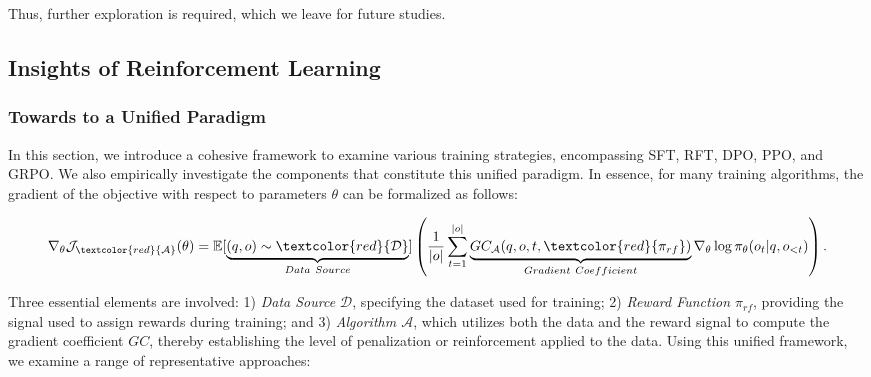 \begin{itemize}[topsep=0pt]
\begin{itemize}[topsep=0pt]
Thus, further exploration is required, which we leave for future studies.

\subsection{Insights of Reinforcement Learning}
\subsubsection{Towards to a Unified Paradigm} In this section, we introduce a cohesive framework to examine various training strategies, encompassing SFT, RFT, DPO, PPO, and GRPO. We also empirically investigate the components that constitute this unified paradigm. In essence, for many training algorithms, the gradient of the objective with respect to parameters $\theta$ can be formalized as follows:

\begin{equation}
    \nabla_{\theta}\mathcal{J}_{\textcolor{red}{\mathcal{A}}}(\theta) = \mathbb{E}[\underbrace{(q,o) \sim \textcolor{red}{\mathcal{D}}}_{Data \ Source}]\left( \frac{1}{|o|} \sum_{t=1}^{|o|}  \underbrace{GC_{{\mathcal{A}}}(q, o, t, \textcolor{red}{\pi_{{rf}}})}_{Gradient \ Coefficient}  \nabla_{\theta}\log \pi_{\theta}(o_t | q, o_{<t})\right).
\label{eq:objective}
\end{equation}

Three essential elements are involved: 1) \textit{Data Source $\mathcal{D}$}, specifying the dataset used for training; 2) \textit{Reward Function $\pi_{{rf}}$}, providing the signal used to assign rewards during training; and 3) \textit{Algorithm $\mathcal{A}$}, which utilizes both the data and the reward signal to compute the gradient coefficient $GC$, thereby establishing the level of penalization or reinforcement applied to the data. Using this unified framework, we examine a range of representative approaches:


\end{itemize}
\end{itemize}
